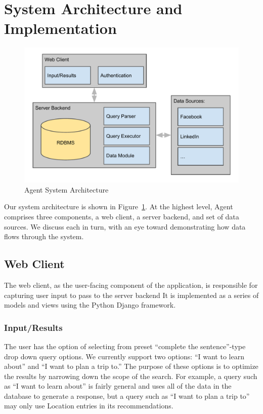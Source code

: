 \section{System Architecture and Implementation}
\label{sec:architecture}

\begin{figure}[!h]
\begin{center}
\includegraphics[width=0.75\linewidth]{figs/sysarch.pdf}
\caption{Agent System Architecture}
\label{fig:sysarch}
\end{center}
\end{figure}

Our system architecture is shown in Figure~\ref{fig:sysarch}. At the highest
level, Agent comprises three components, a web client, a server backend, and set
of data sources. We discuss each in turn, with an eye toward demonstrating how
data flows through the system.

\subsection{Web Client}
The web client, as the user-facing component of the application, is responsible
for capturing user input to pass to the server backend  It is implemented as a
series of models and views using the Python Django framework.

\subsubsection{Input/Results}
The user has the option of selecting from preset ``complete the sentence''-type drop 
down query options. We currently support two options: ``I want to learn about'' and
``I want to plan a trip to.'' The purpose of these options is to optimize the results by
narrowing down the scope of the search. For example, a query such as ``I want to
learn about'' is fairly general and uses all of the data in the database to generate
a response, but a query such as ``I want to plan a trip to'' may only use Location entries
in its recommendations.

